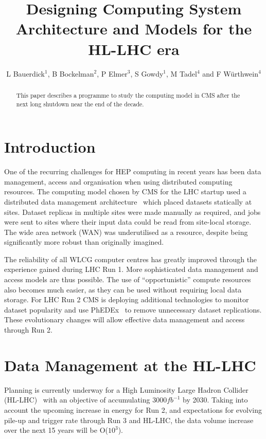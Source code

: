 \documentclass[a4paper]{jpconf}
\begin{document}
\title{Designing Computing System Architecture and Models for the HL-LHC era}

\author{L Bauerdick$^1$, B Bockelman$^2$, P Elmer$^3$, S Gowdy$^1$, M
  Tadel$^4$ and F W\"urthwein$^4$}

\address{$^1$Fermilab, Batavia, IL 60510, USA\\
  $^2$Computer Science \& Engineering, University of Nebraska-Lincoln,
  Lincoln, NE 68588, USA\\
  $^3$Department of Physics, Princeton University, Princeton, NJ 08540, USA\\
  $^4$Department of Physics, UCSD, La Jolla, CA  92093, USA}


\begin{abstract}
This paper describes a programme to study the computing model in CMS after 
the next long shutdown near the end of the decade.
\end{abstract}

\section{Introduction}

One of the recurring challenges for HEP computing in recent years has
been data management, access and organisation when using distributed
computing resources.  The computing model chosen by CMS for the LHC
startup used a distributed data management architecture~\cite{CMSCTDR}
which placed datasets statically at sites. Dataset replicas in
multiple sites were made manually as required, and jobs were sent to
sites where their input data could be read from site-local storage.
The wide area network (WAN) was underutilised as a resource, despite
being significantly more robust than originally imagined.

The reliability of all WLCG computer centres has greatly improved
through the experience gained during LHC Run 1. More sophisticated
data management and access models are thus possible. The use of
``opportunistic'' compute resources also becomes much easier, as they
can be used without requiring local data storage.  For LHC Run 2 CMS
is deploying additional technologies to monitor dataset popularity and
use PhEDEx~\cite{PHEDEX} to remove unnecessary dataset
replications. These evolutionary changes will allow effective data
management and access through Run 2.

\section{Data Management at the HL-LHC}
Planning is currently underway for a High Luminosity Large Hadron
Collider (HL-LHC)~\cite{HLLHC} with an objective of accumulating
${3000fb^{-1}}$ by 2030. Taking into account the upcoming increase
in energy for Run 2, and expectations for evolving pile-up and
trigger rate through Run 3 and HL-LHC, the data volume increase
over the next 15 years will be O($10^3$).
\end{document}
